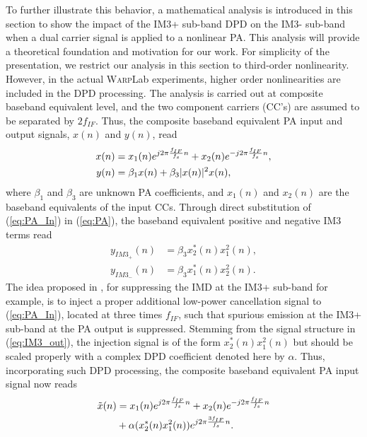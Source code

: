 \documentclass[9pt,conference]{IEEEtran}
\begin{document}
\begin{spacing}{0.88}
To further illustrate this behavior, a mathematical analysis is introduced in this section to show the impact of the IM3+ sub-band DPD on the IM3- sub-band when a dual carrier signal is applied to a nonlinear PA. This analysis will provide a theoretical foundation and motivation for our work. For simplicity of the presentation, we restrict our analysis in this section to third-order nonlinearity. However, in the actual \textsc{Warp}Lab experiments, higher order nonlinearities are included in the DPD processing.
The analysis is carried out at composite baseband equivalent level, and the two component carriers (CC's) are assumed to be separated by $2 f_{IF}$. Thus, the composite baseband equivalent PA input and output signals, $x(n)$ and $y(n)$, read
\begin{align}
\small
x(n) &= x_1(n) e^{j 2\pi \frac{f_{IF}}{f_s} n} + x_2(n) e^{-j 2\pi \frac{f_{IF}}{f_s} n}, \label{eq:PA_In} \\
y(n) &= \beta_1 x(n) + \beta_3 |x(n)|^2 x(n), \label{eq:PA}
\end{align}
\normalsize 
where $\beta_1$ and $\beta_3$ are unknown PA coefficients, and $x_1(n)$ and $x_2(n)$ are the baseband equivalents of the input CCs. Through direct substitution of (\ref{eq:PA_In}) in (\ref{eq:PA}), the baseband equivalent positive and negative IM3 terms read
\begin{align}
y_{IM3_+}(n) &= \beta_3  x_2^*(n)x_1^2(n), \label{eq:IM3_out} \\
y_{IM3_-}(n) &= \beta_3  x_1^*(n)x_2^2(n). 
\label{eq:IM3_neg_out}
\end{align}
\normalsize
The idea proposed in \cite{ICASSP2014}, for suppressing the IMD at the IM3+ sub-band for example, is to inject a proper additional low-power cancellation signal to (\ref{eq:PA_In}), located at three times $f_{IF}$, such that spurious emission at the IM3+ sub-band at the PA output is suppressed. Stemming from the signal structure in (\ref{eq:IM3_out}), the injection signal is of the form $x_2^*(n)x_1^2(n)$ but should be scaled properly with a complex DPD coefficient denoted here by $\alpha$. Thus, incorporating such DPD processing, the composite baseband equivalent PA input signal now reads
\begin{align}
\small
\tilde{x}(n) &= x_1(n) e^{j 2\pi \frac{f_{IF}}{f_s} n} + x_2(n) e^{-j 2\pi \frac{f_{IF}}{f_s} n} \nonumber\\ 
&+ \alpha(x_2^*(n)x_1^2(n)) e^{j 2\pi \frac{3 f_{IF}}{f_s} n}. \label{eq:PA_In_DPD}
\end{align}
\normalsize

\end{spacing}
\end{document}
